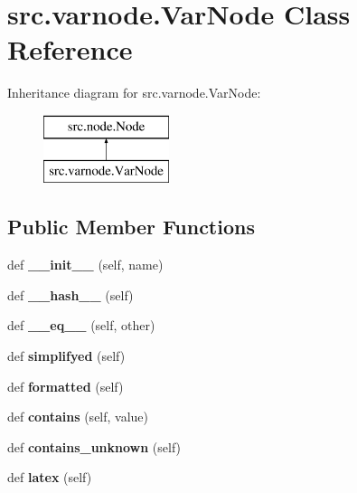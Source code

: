 \hypertarget{classsrc_1_1varnode_1_1VarNode}{}\section{src.\+varnode.\+Var\+Node Class Reference}
\label{classsrc_1_1varnode_1_1VarNode}
Inheritance diagram for src.\+varnode.\+Var\+Node\+:\begin{figure}[H]
\begin{center}
\leavevmode
\includegraphics[height=2.000000cm]{classsrc_1_1varnode_1_1VarNode}
\end{center}
\end{figure}
\subsection*{Public Member Functions}
\begin{DoxyCompactItemize}
\item 
\mbox{\label{classsrc_1_1varnode_1_1VarNode_aa630ffa27288975dd6c09233f38b2eb9}} 
def {\bfseries \+\_\+\+\_\+init\+\_\+\+\_\+} (self, name)
\item 
\mbox{\label{classsrc_1_1varnode_1_1VarNode_ae238bcc420623c7c3df9327230b5d541}} 
def {\bfseries \+\_\+\+\_\+hash\+\_\+\+\_\+} (self)
\item 
\mbox{\label{classsrc_1_1varnode_1_1VarNode_a78e85917702c2a35f57600c7f70d1844}} 
def {\bfseries \+\_\+\+\_\+eq\+\_\+\+\_\+} (self, other)
\item 
\mbox{\label{classsrc_1_1varnode_1_1VarNode_ad4bdffd574d8d62c34efa3bd7943880e}} 
def {\bfseries simplifyed} (self)
\item 
\mbox{\label{classsrc_1_1varnode_1_1VarNode_a8ba0baacf1dd39e9126df15d5e573e9d}} 
def {\bfseries formatted} (self)
\item 
\mbox{\label{classsrc_1_1varnode_1_1VarNode_a6aef19d72f67559cd9eac6078f168cf2}} 
def {\bfseries contains} (self, value)
\item 
\mbox{\label{classsrc_1_1varnode_1_1VarNode_a819734f6e491de3c0702935e68e4b667}} 
def {\bfseries contains\+\_\+unknown} (self)
\item 
\mbox{\label{classsrc_1_1varnode_1_1VarNode_a004861059242e634e92e27635bfbf305}} 
def {\bfseries latex} (self)
\end{DoxyCompactItemize}
